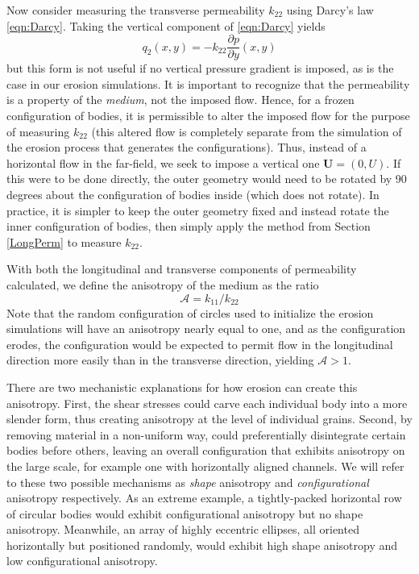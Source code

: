 \documentclass[3p]{elsarticle}
\newcommand{\UU}{{\mathbf{U}}}
\newcommand{\pderiv}[2]{\frac{\partial #1}{\partial #2}}
\newcommand{\anis}{\mathcal{A}}
\begin{document}
Now consider measuring the transverse permeability $k_{22}$ using Darcy's law \eqref{eqn:Darcy}. Taking the vertical component of \eqref{eqn:Darcy} yields
\begin{equation}
\label{q1}
q_2(x,y) = -k_{22} \pderiv{p}{y}(x,y)
\end{equation}
but this form is not useful if no vertical pressure gradient is imposed, as is the case in our erosion simulations. It is important to recognize that the permeability is a property of the {\em medium}, not the imposed flow. Hence, for a frozen configuration of bodies, it is permissible to alter the imposed flow for the purpose of measuring $k_{22}$ (this altered flow is completely separate from the simulation of the erosion process that generates the configurations). Thus, instead of a horizontal flow in the far-field, we seek to impose a vertical one $\UU = (0,U)$.
If this were to be done directly, the outer geometry would need to be rotated by 90 degrees about the configuration of bodies inside (which does not rotate). In practice, it is simpler to keep the outer geometry fixed and instead rotate the inner configuration of bodies, then simply apply the method from Section \ref{LongPerm} to measure $k_{22}$.

With both the longitudinal and transverse components of permeability calculated, we define the anisotropy of the medium as the ratio
\begin{equation}
\anis = k_{11} / k_{22}
\end{equation}
Note that the random configuration of circles used to initialize the erosion simulations will have an anisotropy nearly equal to one, and as the configuration erodes, the configuration would be expected to permit flow in the longitudinal direction more easily than in the transverse direction, yielding $\anis > 1$.

There are two mechanistic explanations for how erosion can create this anisotropy. First, the shear stresses could carve each individual body into a more slender form, thus creating anisotropy at the level of individual grains. Second, by removing material in a non-uniform way, could preferentially disintegrate certain bodies before others, leaving an overall configuration that exhibits anisotropy on the large scale, for example one with horizontally aligned channels. We will refer to these two possible mechanisms as {\em shape} anisotropy and {\em configurational} anisotropy respectively. As an extreme example, a tightly-packed horizontal row of circular bodies would exhibit configurational anisotropy but no shape anisotropy. Meanwhile, an array of highly eccentric ellipses, all oriented horizontally but positioned randomly, would exhibit high shape anisotropy and low configurational anisotropy.
\end{document}
